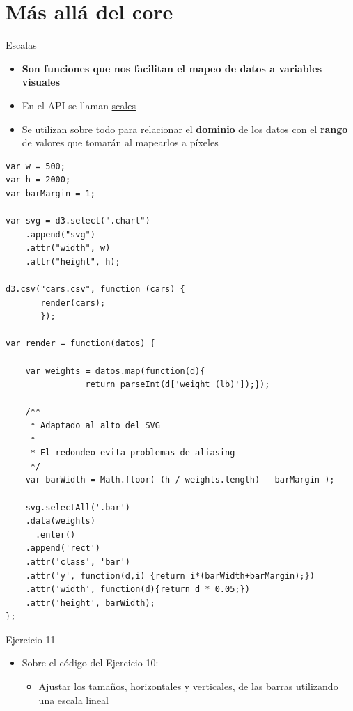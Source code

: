 \documentclass[ignorenonframetext,]{beamer}
\begin{document}
\section{Más allá del core}\label{muxe1s-alluxe1-del-core}

\begin{frame}{Escalas}

\begin{itemize}
\item
  \textbf{Son funciones que nos facilitan el mapeo de datos a variables
  visuales}
\item
  En el API se llaman
  \href{https://github.com/mbostock/d3/wiki/API-Reference\#d3scale-scales}{scales}
\item
  Se utilizan sobre todo para relacionar el \textbf{dominio} de los
  datos con el \textbf{rango} de valores que tomarán al mapearlos a
  píxeles
\end{itemize}

\end{frame}

\begin{frame}[fragile]

\begin{lstlisting}
var w = 500;
var h = 2000;
var barMargin = 1;

var svg = d3.select(".chart")
    .append("svg")
    .attr("width", w)
    .attr("height", h);

d3.csv("cars.csv", function (cars) {
       render(cars);
       });
           
var render = function(datos) {
    
    var weights = datos.map(function(d){
                return parseInt(d['weight (lb)']);});

    /**
     * Adaptado al alto del SVG
     * 
     * El redondeo evita problemas de aliasing
     */
    var barWidth = Math.floor( (h / weights.length) - barMargin );

    svg.selectAll('.bar')
    .data(weights)
      .enter()
    .append('rect')
    .attr('class', 'bar')
    .attr('y', function(d,i) {return i*(barWidth+barMargin);})
    .attr('width', function(d){return d * 0.05;})
    .attr('height', barWidth);
};
\end{lstlisting}

\end{frame}

\begin{frame}{Ejercicio 11}

\begin{itemize}
\itemsep1pt\parskip0pt
\item
  Sobre el código del Ejercicio 10:

  \begin{itemize}
  \itemsep1pt\parskip0pt
  \item
    Ajustar los tamaños, horizontales y verticales, de las barras
    utilizando una
    \href{https://github.com/mbostock/d3/wiki/Quantitative-Scales\#linear}{escala
    lineal}
  \end{itemize}
\end{itemize}

\end{frame}
\end{document}
